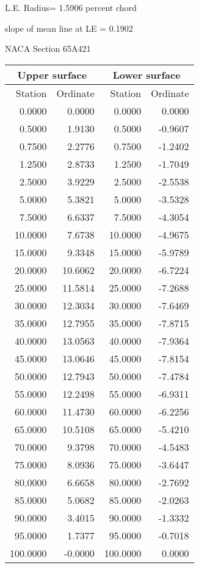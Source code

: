\documentclass[11pt]{book}
\begin{document}
L.E. Radius=  1.5906 percent chord


 slope of mean line at LE =  0.1902
 \newpage
  \label{s65A421}
 \begin{Large}
 NACA Section 65A421
 \end{Large}
  
 \vspace{8mm}
 \begin{tabular}{|r|r|r|r|} \hline 
 \multicolumn{2}{|c|}{Upper surface} & \multicolumn{2}{|c|}{Lower surface} \\
 \hline
 Station & Ordinate & Station & Ordinate \\
 \hline
0.0000 & 0.0000 & 0.0000 & 0.0000 \\
0.5000 & 1.9130 & 0.5000 & -0.9607 \\
0.7500 & 2.2776 & 0.7500 & -1.2402 \\
1.2500 & 2.8733 & 1.2500 & -1.7049 \\
2.5000 & 3.9229 & 2.5000 & -2.5538 \\
5.0000 & 5.3821 & 5.0000 & -3.5328 \\
7.5000 & 6.6337 & 7.5000 & -4.3054 \\
10.0000 & 7.6738 & 10.0000 & -4.9675 \\
15.0000 & 9.3348 & 15.0000 & -5.9789 \\
20.0000 & 10.6062 & 20.0000 & -6.7224 \\
25.0000 & 11.5814 & 25.0000 & -7.2688 \\
30.0000 & 12.3034 & 30.0000 & -7.6469 \\
35.0000 & 12.7955 & 35.0000 & -7.8715 \\
40.0000 & 13.0563 & 40.0000 & -7.9364 \\
45.0000 & 13.0646 & 45.0000 & -7.8154 \\
50.0000 & 12.7943 & 50.0000 & -7.4784 \\
55.0000 & 12.2498 & 55.0000 & -6.9311 \\
60.0000 & 11.4730 & 60.0000 & -6.2256 \\
65.0000 & 10.5108 & 65.0000 & -5.4210 \\
70.0000 & 9.3798 & 70.0000 & -4.5483 \\
75.0000 & 8.0936 & 75.0000 & -3.6447 \\
80.0000 & 6.6658 & 80.0000 & -2.7692 \\
85.0000 & 5.0682 & 85.0000 & -2.0263 \\
90.0000 & 3.4015 & 90.0000 & -1.3332 \\
95.0000 & 1.7377 & 95.0000 & -0.7018 \\
100.0000 & -0.0000 & 100.0000 & 0.0000 \\
 \hline 
 \end{tabular}
\end{document}
